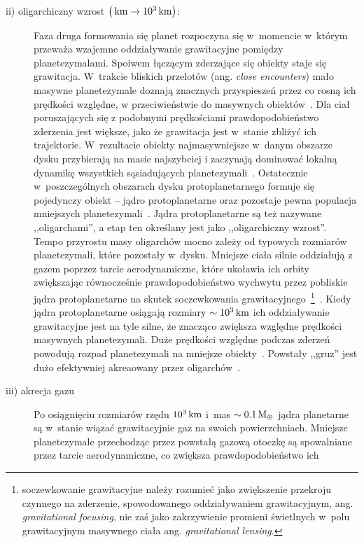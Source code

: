 \begin{description}
\item[ii) oligarchiczny wzrost $\left(\hbox{$\thinspace\textrm{km}$} \rightarrow
   10^3\hbox{$\thinspace\textrm{km}$}\right)$:]
   Faza druga formowania się planet rozpoczyna się w~momencie w~którym przeważa
   wzajemne oddziaływanie grawitacyjne pomiędzy planetezymalami. Spoiwem
   łączącym zderzające się obiekty staje się grawitacja. W~trakcie bliskich
   przelotów (ang. \emph{close encounters}) mało masywne planetezymale doznają
   znacznych przyspieszeń przez co rosną ich prędkości względne, w
   przeciwieństwie do masywnych obiektów~\cite{WS93}. Dla ciał poruszających się z
   podobnymi prędkościami prawdopodobieństwo zderzenia jest większe, jako że
   grawitacja jest w~stanie zbliżyć ich trajektorie. W~rezultacie obiekty
   najmasywniejsze w~danym obszarze dysku przybierają na masie najszybciej i
   zaczynają dominować lokalną dynamikę wszystkich sąsiadujących
   planetezymali~\cite{IM93}. Ostatecznie w~poszczególnych obszarach dysku
   protoplanetarnego formuje się pojedynczy obiekt -- jądro protoplanetarne
   oraz pozostaje pewna populacja mniejszych planetezymali~\cite{KI98}. Jądra
   protoplanetarne są też nazywane ,,oligarchami'', a etap ten określany jest
   jako ,,oligarchiczny wzrost''.
   Tempo przyrostu masy oligarchów mocno zależy od typowych rozmiarów
   planetezymali, które pozostały w~dysku. Mniejsze ciała silnie oddziałują z
   gazem poprzez tarcie aerodynamiczne, które ukoławia ich orbity zwiększając
   równocześnie prawdopodobieństwo wychwytu przez pobliskie jądra
   protoplanetarne na skutek soczewkowania
   grawitacyjnego~\footnote{soczewkowanie grawitacyjne należy rozumieć jako
      zwiększenie przekroju czynnego na zderzenie, spowodowanego oddziaływaniem
   grawitacyjnym, ang. \emph{gravitational focusing}, nie zaś jako zakrzywienie
promieni świetlnych w~polu grawitacyjnym masywnego ciała ang.
\emph{gravitational lensing}.}~\cite{R04}.
   Kiedy jądra protoplanetarne osiągają rozmiary $\sim10^3\hbox{$\thinspace\textrm{km}$}$ ich oddziaływanie
   grawitacyjne jest na tyle silne, że znacząco zwiększa względne prędkości
   masywnych planetezymali. Duże prędkości względne podczas zderzeń powodują rozpad
   planetezymali na mniejsze obiekty~\cite{KB04}. Powstały ,,gruz'' jest dużo
   efektywniej akreaowany przez oligarchów~\cite{WS93}.
\item[iii) akrecja gazu]
   Po osiągnięciu rozmiarów rzędu $10^3\hbox{$\thinspace\textrm{km}$}$ i~mas $\sim 0.1\hbox{$\mathrm{\thinspace M_{\oplus}}$}$ jądra
   planetarne są w~stanie wiązać grawitacyjnie gaz na swoich powierzchniach.
   Mniejsze planetezymale przechodząc przez powstałą gazową otoczkę są
   spowalniane przez tarcie aerodynamiczne, co zwiększa prawdopodobieństwo ich

\end{description}
